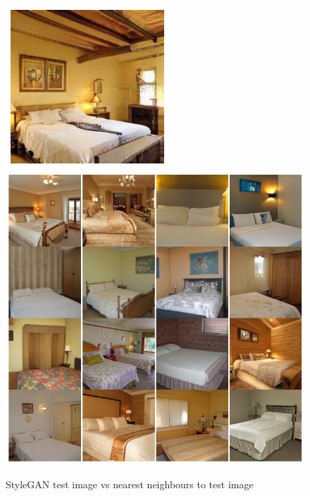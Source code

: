 \documentclass{article}
\begin{document}
    \begin{figure}[H]
          \centering
          \includegraphics[scale=0.5]{nearest-neighbour/style_test_image.png}
          \ \ 
          \includegraphics[scale=0.3]{nearest-neighbour/style_nearest_images.png}\\
          \caption{StyleGAN test image vs nearest neighbours to test image}
    \end{figure}
    \newpage
\end{document}
